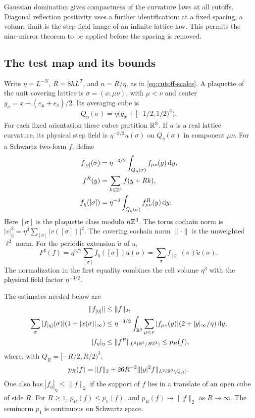 Gaussian domination gives compactness of the curvature laws at all
cutoffs. Diagonal reflection positivity uses a further identification:
at a fixed spacing, a volume limit is the step-field image of an
infinite lattice law. This permits the nine-mirror theorem to be
applied before the spacing is removed.

\subsection{The test map and its bounds}

Write $\eta=L^{-N}$, $R=8hL^T$, and $n=R/\eta$, as in
\eqref{eq:cutoff-scales}. A plaquette of the unit covering lattice is
$\sigma=(x;\mu\nu)$, with $\mu<\nu$ and center
$y_\sigma=x+(e_\mu+e_\nu)/2$. Its averaging cube is
\[
 Q_\eta(\sigma)=\eta\bigl(y_\sigma+[-1/2,1/2)^3\bigr).
\]
For each fixed orientation these cubes partition $\mathbb R^3$.
If $u$ is a real lattice curvature, its physical step field is
$\eta^{-3/2}u(\sigma)$ on $Q_\eta(\sigma)$ in component $\mu\nu$.
For a Schwartz two-form $f$, define
\begin{align}
 f_{[\eta]}(\sigma)
   &=\eta^{-3/2}\int_{Q_\eta(\sigma)}f_{\mu\nu}(y)\,\mathrm d y,
                                                   \label{eq:limit-test-cover}\\
 f^R(y)&=\sum_{k\in\mathbb Z^3}f(y+Rk),\notag\\
 f_\eta([\sigma])
   &=\eta^{-3}\int_{Q_\eta(\sigma)}f^R_{\mu\nu}(y)\,\mathrm d y.
                                                   \label{eq:limit-test-torus}
\end{align}
Here $[\sigma]$ is the plaquette class modulo $n\mathbb Z^3$.
The torus cochain norm is $|v|_\eta^2=\eta^3\sum_{[\sigma]}|v([\sigma])|^2$.
The covering cochain norm $\|\cdot\|$ is the unweighted $\ell^2$ norm.
For the periodic extension $\widetilde u$ of $u$,
\begin{equation}\label{eq:limit-step-pairing}
 F^\sharp(f)=\eta^{3/2}\sum_{[\sigma]}f_\eta([\sigma])u(\sigma)
            =\sum_\sigma f_{[\eta]}(\sigma)\widetilde u(\sigma).
\end{equation}
The normalization in the first equality combines the cell volume
$\eta^3$ with the physical field factor $\eta^{-3/2}$.

The estimates needed below are
\begin{align}
 \|f_{[\eta]}\|&\le\|f\|_2, \label{eq:limit-cover-norm}\\
 \sum_\sigma|f_{[\eta]}(\sigma)|(1+|x(\sigma)|_\infty)
 &\le\eta^{-3/2}\int_{\mathbb R^3}\sum_{\mu<\nu}|f_{\mu\nu}(y)|
                         (2+|y|_\infty/\eta)\,\mathrm d y, \label{eq:limit-cover-sum}\\
 |f_\eta|_\eta&\le\|f^R\|_{L^2(\mathbb R^3/R\mathbb Z^3)}\le p_R(f),\label{eq:limit-torus-norm}
\end{align}
where, with $Q_R=[-R/2,R/2)^3$,
\begin{equation}\label{eq:limit-periodic-seminorm}
 p_R(f)=\|f\|_2+
        26R^{-2}\||y|^2f\|_{L^2(\mathbb R^3\setminus Q_R)}.
\end{equation}
One also has $|f_\eta|_\eta\le\|f\|_2$ if the support of $f$ lies
in a translate of an open cube of side $R$. For $R\ge1$,
$p_R(f)\le p_1(f)$, and $p_R(f)\to\|f\|_2$ as $R\to\infty$.
The seminorm $p_1$ is continuous on Schwartz space.


